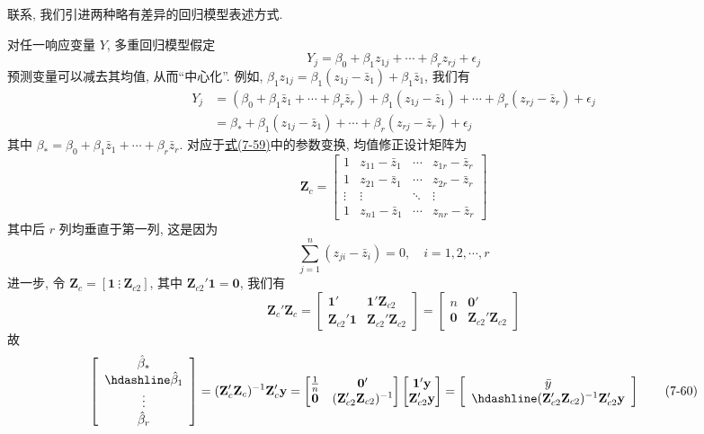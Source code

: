 
联系, 我们引进两种略有差异的回归模型表述方式.


对任一响应变量 $Y$, 多重回归模型假定
\[
Y_j=\beta_0+\beta_1z_{1j}+\cdots+\beta_rz_{rj}+\epsilon_j
\]
预测变量可以减去其均值, 从而“中心化”. 例如, $\beta_1z_{1j}=\beta_1(z_{1j}-\bar{z}_1)+\beta_1\bar{z}_1$, 我们有
\label{eq:7-59}
\begin{equation}
\begin{aligned}
Y_j&=(\beta_0+\beta_1\bar{z}_1+\cdots+\beta_r\bar{z}_r)+\beta_1(z_{1j}-\bar{z}_1)+\cdots+\beta_r(z_{rj}-\bar{z}_r)+\epsilon_j\\
&=\beta_*+\beta_1(z_{1j}-\bar{z}_1)+\cdots+\beta_r(z_{rj}-\bar{z}_r)+\epsilon_j
\end{aligned} \tag{7-59}
\end{equation}
其中 $\beta_*=\beta_0+\beta_1\bar{z}_1+\cdots+\beta_r\bar{z}_r$. 对应于\hyperref[eq:7-59]{式(7-59)}中的参数变换, 均值修正设计矩阵为
\[
\mathbf{Z}_c=\begin{bmatrix}
1&z_{11}-\bar{z}_1&\cdots&z_{1r}-\bar{z}_r\\
1&z_{21}-\bar{z}_1&\cdots&z_{2r}-\bar{z}_r\\
\vdots&\vdots&\ddots&\vdots\\
1&z_{n1}-\bar{z}_1&\cdots&z_{nr}-\bar{z}_r
\end{bmatrix}
\]
其中后 $r$ 列均垂直于第一列, 这是因为
\[
\sum_{j=1}^{n}(z_{ji}-\bar{z}_i)=0,\quad i=1,2,\cdots,r
\]
进一步, 令 $\mathbf{Z}_c=[\mathbf{1}\ \vdots\ \mathbf{Z}_{c2}]$, 其中 $\mathbf{Z}_{c2}'\mathbf{1}=\mathbf{0}$, 我们有
\[
\mathbf{Z}_c'\mathbf{Z}_c=\begin{bmatrix}\mathbf{1}'&\mathbf{1}'\mathbf{Z}_{c2}\\\mathbf{Z}_{c2}'\mathbf{1}&\mathbf{Z}_{c2}'\mathbf{Z}_{c2}\end{bmatrix}=\begin{bmatrix}n&\mathbf{0}'\\\mathbf{0}&\mathbf{Z}_{c2}'\mathbf{Z}_{c2}\end{bmatrix}
\]
故
\label{eq:7-60}
\begin{equation}
\left[\begin{array}{c}\hat{\beta}_*\\\hdashline\hat{\beta}_1\\\vdots\\\hat{\beta}_r\end{array}\right]=(\mathbf{Z}_c'\mathbf{Z}_c)^{-1}\mathbf{Z}_c'\mathbf{y}
=\begin{bmatrix}\frac{1}{n}&\mathbf{0}'\\\mathbf{0}&(\mathbf{Z}_{c2}'\mathbf{Z}_{c2})^{-1}\end{bmatrix}\begin{bmatrix}\mathbf{1}'\mathbf{y}\\\mathbf{Z}_{c2}'\mathbf{y}\end{bmatrix}
=\left[\begin{array}{c}\bar{y}\\\hdashline(\mathbf{Z}_{c2}'\mathbf{Z}_{c2})^{-1}\mathbf{Z}_{c2}'\mathbf{y}\end{array}\right] \tag{7-60}
\end{equation}
